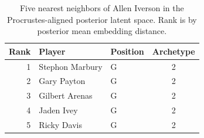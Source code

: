 \begin{table}[htbp]
  \centering\small
  \begin{tabular}{rllc}
    \toprule
    Rank & Player & Position & Archetype \\
    \midrule
    1 & Stephon Marbury & G & 2 \\
    2 & Gary Payton & G & 2 \\
    3 & Gilbert Arenas & G & 2 \\
    4 & Jaden Ivey & G & 2 \\
    5 & Ricky Davis & G & 2 \\
    \bottomrule
  \end{tabular}
  \caption{Five nearest neighbors of Allen Iverson in the Procrustes-aligned posterior latent space. Rank is by posterior mean embedding distance.}
  \label{tab:Allen_Iverson_neighbors}
\end{table}

